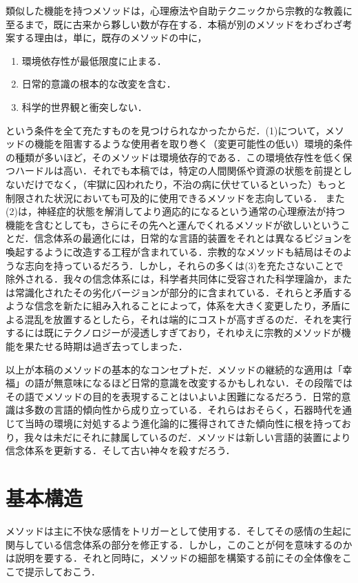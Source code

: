 類似した機能を持つメソッドは，心理療法や自助テクニックから宗教的な教義に至るまで，既に古来から夥しい数が存在する．本稿が別のメソッドをわざわざ考案する理由は，単に，既存のメソッドの中に，
\begin{enumerate}[label=(\arabic*)]
    \item 環境依存性が最低限度に止まる．
    \item 日常的意識の根本的な改変を含む．
    \item 科学的世界観と衝突しない．
\end{enumerate}
という条件を全て充たすものを見つけられなかったからだ．(1)について，メソッドの機能を阻害するような使用者を取り巻く（変更可能性の低い）環境的条件の種類が多いほど，そのメソッドは環境依存的である．この環境依存性を低く保つハードルは高い．それでも本稿では，特定の人間関係や資源の状態を前提としないだけでなく，（牢獄に囚われたり，不治の病に伏せているといった）もっと制限された状況においても可及的に使用できるメソッドを志向している．
また(2)は，神経症的状態を解消してより適応的になるという通常の心理療法が持つ機能を含むとしても，さらにその先へと運んでくれるメソッドが欲しいということだ．信念体系の最適化には，日常的な言語的装置をそれとは異なるビジョンを喚起するように改造する工程が含まれている．宗教的なメソッドも結局はそのような志向を持っているだろう．しかし，それらの多くは(3)を充たさないことで除外される．我々の信念体系には，科学者共同体に受容された科学理論か，または常識化されたその劣化バージョンが部分的に含まれている．それらと矛盾するような信念を新たに組み入れることによって，体系を大きく変更したり，矛盾による混乱を放置するとしたら，それは端的にコストが高すぎるのだ．それを実行するには既にテクノロジーが浸透しすぎており，それゆえに宗教的メソッドが機能を果たせる時期は過ぎ去ってしまった．

以上が本稿のメソッドの基本的なコンセプトだ．メソッドの継続的な適用は「幸福」の語が無意味になるほど日常的意識を改変するかもしれない．その段階ではその語でメソッドの目的を表現することはいよいよ困難になるだろう．日常的意識は多数の言語的傾向性から成り立っている．それらはおそらく，石器時代を通じて当時の環境に対処するよう進化論的に獲得されてきた傾向性に根を持っており，我々は未だにそれに隷属しているのだ．メソッドは新しい言語的装置により信念体系を更新する．そして古い神々を殺すだろう．

\section{基本構造}
\label{sec:基本構造}

メソッドは主に不快な感情をトリガーとして使用する．そしてその感情の生起に関与している信念体系の部分を修正する．しかし，このことが何を意味するのかは説明を要する．それと同時に，メソッドの細部を構築する前にその全体像をここで提示しておこう．

